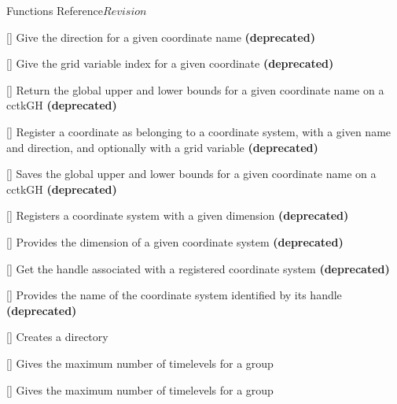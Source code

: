 \begin{cactuspart}{ Functions Reference}{}{$Revision$}
\begin{Lentry}
\item[\code{CCTK\_CoordDir}] [\pageref{CCTK-CoordDir}]
  Give the direction for a given coordinate name \textbf{(deprecated)}

\item[\code{CCTK\_CoordIndex}] [\pageref{CCTK-CoordIndex}]
  Give the grid variable index for a given coordinate \textbf{(deprecated)}

\item[\code{CCTK\_CoordRange}] [\pageref{CCTK-CoordRange}]
  Return the global upper and lower bounds for a given coordinate name
  on a cctkGH \textbf{(deprecated)}

\item[\code{CCTK\_CoordRegisterData}] [\pageref{CCTK-CoordRegisterData}]
  Register a coordinate as belonging to a coordinate system,
  with a given name and direction, and optionally with a grid variable
  \textbf{(deprecated)}

\item[\code{CCTK\_CoordRegisterRange}] [\pageref{CCTK-CoordRegisterRange}]
  Saves the global upper and lower bounds for a given coordinate name
  on a cctkGH \textbf{(deprecated)}

\item[\code{CCTK\_CoordRegisterSystem}] [\pageref{CCTK-CoordRegisterSystem}]
  Registers a coordinate system with a given dimension \textbf{(deprecated)}

\item[\code{CCTK\_CoordSystemDim}] [\pageref{CCTK-CoordDim}]
  Provides the dimension of a given coordinate system \textbf{(deprecated)}

\item[\code{CCTK\_CoordSystemHandle}] [\pageref{CCTK-CoordSystemHandle}]
  Get the handle associated with a registered coordinate system
  \textbf{(deprecated)}

\item[\code{CCTK\_CoordSystemName}] [\pageref{CCTK-CoordSystemName}]
  Provides the name of the coordinate system identified by its handle
  \textbf{(deprecated)}

\item[\code{CCTK\_CreateDirectory}] [\pageref{CCTK-CreateDirectory}]
  Creates a directory

\item[\code{CCTK\_DeclaredTimelevels}] [\pageref{CCTK-DeclaredTimelevels}]
  Gives the maximum number of timelevels for a group

\item[\code{CCTK\_DeclaredTimelevelsGI}] [\pageref{CCTK-DeclaredTimelevelsGI}]
  Gives the maximum number of timelevels for a group


\end{Lentry}
\end{cactuspart}
